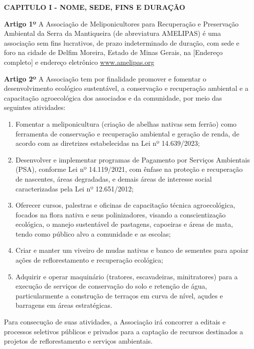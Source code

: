 \documentclass[12pt]{article}
\newcommand{\capitulo}[1]{\vspace{1.0em}\begin{center}\fontseries{b}\selectfont\textbf{\MakeUppercase{#1}}\end{center}}
\newcommand{\artigo}[1]{\vspace{1.0em}\noindent\textbf{#1}\hspace{0.75em}}
\newcommand{\paragrafo}[1]{\vspace{1.0em}\noindent{#1}\hspace{0.75em}}
\newcommand{\titulo}[1]{\begin{center}\fontsize{18}{22}\fontseries{b}\selectfont{#1\\[1.0em]}\end{center}}
\newcommand{\subtitulo}[1]{\begin{center}\fontsize{16}{17}\fontseries{m}\selectfont{#1\\[0.5em]}\end{center}}
\newcommand{\subsubtitulo}[1]{\begin{center}\fontsize{10}{12}\fontseries{m}\selectfont{#1\\[2.0em]}\end{center}}
\begin{document}
\titulo{ESTATUTO SOCIAL}
\subtitulo{Associação de Meliponicultores para Recuperação \\e Preservação Ambiental da Serra da Mantiqueira}\subsubtitulo{CNPJ 12.3456.789/0001-00}


\capitulo{Capitulo I - Nome, Sede, Fins e Duração}

\artigo{Artigo 1º} A Associação de Meliponicultores para Recuperação e Preservação Ambiental da Serra da Mantiqueira (de abreviatura AMELIPAS) é uma associação sem fins lucrativos, de prazo indeterminado de duração, com sede e foro na cidade de Delfim Moreira, Estado de Minas Gerais, na [Endereço completo] e endereço eletrônico \url{www.amelipas.org}

\artigo{Artigo 2º} A Associação tem por finalidade promover e fomentar o desenvolvimento ecológico sustentável, a conservação e recuperação ambiental e a capacitação agroecológica dos associados e da comunidade, por meio das seguintes atividades:
\begin{enumerate}[label=\alph*)]
  \item Fomentar a meliponicultura (criação de abelhas nativas sem ferrão) como ferramenta de conservação e recuperação ambiental e geração de renda, de acordo com as diretrizes estabelecidas na Lei nº 14.639/2023;
  \item Desenvolver e implementar programas de Pagamento por Serviços Ambientais (PSA), conforme Lei nº 14.119/2021, com ênfase na proteção e recuperação de nascentes, áreas degradadas, e demais áreas de interesse social caracterizadas pela Lei nº 12.651/2012;
  \item Oferecer cursos, palestras e oficinas de capacitação técnica agroecológica, focados na flora nativa e seus polinizadores, visando a conscientização ecológica, o manejo sustentável de pastagens, capoeiras e áreas de mata, tendo como público alvo a comunidade e as escolas;
  \item Criar e manter um viveiro de mudas nativas e banco de sementes para apoiar ações de reflorestamento e recuperação ecológica;
  \item Adquirir e operar maquinário (tratores, escavadeiras, minitratores) para a execução de serviços de conservação do solo e retenção de água, particularmente a construção de terraços em curva de nível, açudes e barragens em áreas estratégicas.
\end{enumerate}

\paragrafo{§ 1º} Para consecução de suas atividades, a Associação irá concorrer a editais e processos seletivos públicos e privados para a captação de recursos destinados a projetos de reflorestamento e serviços ambientais.
\end{document}
